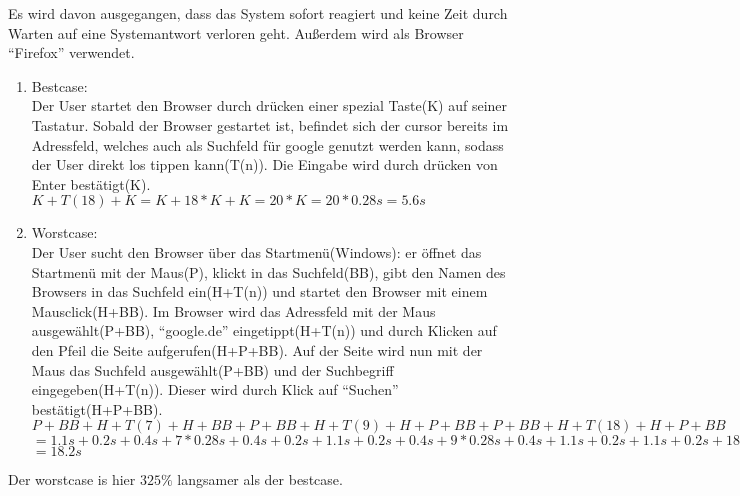 \documentclass[a4paper,10pt]{article}
\begin{document}
\kopf

\renewcommand{\figurename}{Figure}
Es wird davon ausgegangen, dass das System sofort reagiert und keine Zeit durch Warten auf eine Systemantwort verloren geht. Außerdem wird als Browser ``Firefox'' verwendet.
\begin{enumerate}
    \item Bestcase: \\
        Der User startet den Browser durch drücken einer spezial Taste(K) auf seiner Tastatur. Sobald der Browser gestartet ist, befindet sich der cursor bereits im Adressfeld, welches auch als Suchfeld für google genutzt werden kann, sodass der User direkt los tippen kann(T(n)). Die Eingabe wird durch drücken von Enter bestätigt(K). \\
        $K+T(18)+K=K+18*K+K=20*K=20*0.28s=5.6s$
    \item Worstcase: \\
        Der User sucht den Browser über das Startmenü(Windows): er öffnet das Startmenü mit der Maus(P), klickt in das Suchfeld(BB), gibt den Namen des Browsers in das Suchfeld ein(H+T(n)) und startet den Browser mit einem Mausclick(H+BB). Im Browser wird das Adressfeld mit der Maus ausgewählt(P+BB), ``google.de'' eingetippt(H+T(n)) und durch Klicken auf den Pfeil die Seite aufgerufen(H+P+BB). Auf der Seite wird nun mit der Maus das Suchfeld ausgewählt(P+BB) und der Suchbegriff eingegeben(H+T(n)). Dieser wird durch Klick auf ``Suchen'' bestätigt(H+P+BB). \\
        $P+BB+H+T(7)+H+BB+P+BB+H+T(9)+H+P+BB+P+BB+H+T(18)+H+P+BB$ \\
        $=1.1s+0.2s+0.4s+7*0.28s+0.4s+0.2s+1.1s+0.2s+0.4s+9*0.28s+0.4s+1.1s+0.2s+1.1s+0.2s+18*0.28s+0.4s+1.1s+0.2s$ \\
        $=18.2s$ \\
\end{enumerate}
Der worstcase is hier $325\%$ langsamer als der bestcase.
\end{document}
